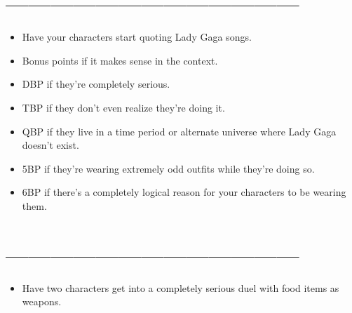 \documentclass[a4paper,12pt]{article}
\newcommand{\bi}{\section{---------------------------------------}\begin{itemize}}
\newcommand{\ei}{\end{itemize}}
\newcommand{\todo}{\item[$\square$]}
\begin{document}
\bi
\todo Have your characters start quoting Lady Gaga songs.
\todo Bonus points if it makes sense in the context.
\todo DBP if they’re completely serious.
\todo TBP if they don’t even realize they’re doing it.
\todo QBP if they live in a time period or alternate universe where Lady Gaga doesn’t exist.
\todo 5BP if they’re wearing extremely odd outfits while they’re doing so.
\todo 6BP if there’s a completely logical reason for your characters to be wearing them.
\ei

\bi
\todo Have two characters get into a completely serious duel with food items as weapons.
\ei
\end{document}
